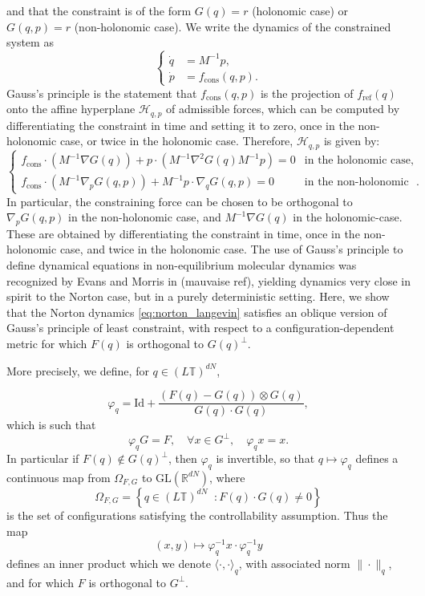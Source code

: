 \documentclass[pdflatex,sn-mathphys]{sn-jnl}%
\theoremstyle{thmstyleone}%
\theoremstyle{thmstyletwo}%
\theoremstyle{thmstylethree}%
\newcommand{\1}{\mathbbm{1}}
\begin{document}
and that the constraint is of the form $G(q)=r$ (holonomic case) or $G(q,p)=r$ (non-holonomic case). We write the dynamics of the constrained system as 
\begin{equation}
    \left\{
    \begin{aligned}
        \dot q &= M^{-1}p,\\
        \dot p &= f_{\mathrm{cons}}(q,p).
    \end{aligned}
    \right.
\end{equation}
Gauss's principle is the statement that $f_{\mathrm{cons}}(q,p)$ is the projection of $f_{\mathrm{ref}}(q)$ onto the affine hyperplane $\mathcal{H}_{q,p}$ of admissible forces, which can be computed by differentiating the constraint in time and setting it to zero, once in the non-holonomic case, or twice in the holonomic case. Therefore, $\mathcal H_{q,p}$ is given by:
\begin{equation}
    \label{eq:gplc_hyperplanes}
    \begin{cases}
        f_{\mathrm{cons}}\cdot \left(M^{-1}\nabla G(q)\right) + p\cdot \left(M^{-1}\nabla^2 G(q)M^{-1}p\right)=0 & \text{in the holonomic case},\\
        f_{\mathrm{cons}}\cdot \left(M^{-1}\nabla_p G(q,p)\right)+M^{-1}p\cdot \nabla_q G(q,p) =0 & \text{in the non-holonomic case}.
    \end{cases}
\end{equation}
In particular, the constraining force can be chosen to be orthogonal to $\nabla_p G(q,p)$ in the non-holonomic case, and $M^{-1}\nabla G(q)$ in the holonomic-case. These are obtained by differentiating the constraint in time, once in the non-holonomic case, and twice in the holonomic case.
The use of Gauss's principle to define dynamical equations in non-equilibrium molecular dynamics was recognized by Evans and Morris in \cite{evans_statistical_2008} (mauvaise ref), yielding dynamics very close in spirit to the Norton case, but in a purely deterministic setting. Here, we show that the Norton dynamics \eqref{eq:norton_langevin} satisfies an oblique version of Gauss's principle of least constraint, with respect to a configuration-dependent metric for which $F(q)$ is orthogonal to $G(q)^{\perp}$.

More precisely, we define, for $q\in (L\mathbb{T})^{dN}$,

\begin{equation}
\varphi_q = \mathrm{Id} + \frac{\left(F(q)-G(q)\right)\otimes G(q)}{G(q)\cdot G(q)},
\end{equation}
which is such that 
\[\varphi_q G=F,\quad \forall x\in G^\perp,\quad\varphi_q x=x.\]
In particular if $F(q)\not\in G(q)^\perp$, then $\varphi_q$ is invertible, so that $q\mapsto \varphi_q$ defines a continuous map from $\Omega_{F,G}$ to $\mathrm{GL}(\mathbb{R}^{dN})$, where
\[\Omega_{F,G}=\left\{ q\in (L\mathbb{T})^{dN} \middle.: F(q)\cdot G(q)\neq 0 \right\}\]
is the set of configurations satisfying the controllability assumption. Thus the map
\[(x,y) \mapsto \varphi_q^{-1}x \cdot \varphi_q^{-1}y\]
defines an inner product which we denote $\langle \cdot ,\cdot \rangle_q$, with associated norm $\|\cdot \|_q$, and for which $F$ is orthogonal to $G^{\perp}$.
\end{document}
